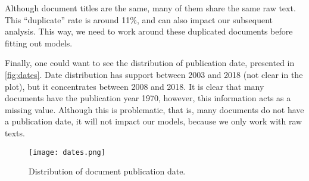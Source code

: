             Although document titles are the same, many of them share the same raw text. This ``duplicate'' rate is around 11\%, and can also impact our subsequent analysis. This way, we need to work around these duplicated documents before fitting out models.

            Finally, one could want to see the distribution of publication date, presented in \autoref{fig:dates}. Date distribution has support between 2003 and 2018 (not clear in the plot), but it concentrates between 2008 and 2018. It is clear that many documents have the publication year 1970, however, this information acts as a missing value. Although this is problematic, that is, many documents do not have a publication date, it will not impact our models, because we only work with raw texts.

            \begin{figure}[H]
                  \texttt{[image: dates.png]}
                  \caption{Distribution of document publication date.}
                  \label{fig:dates}
            \end{figure}
            